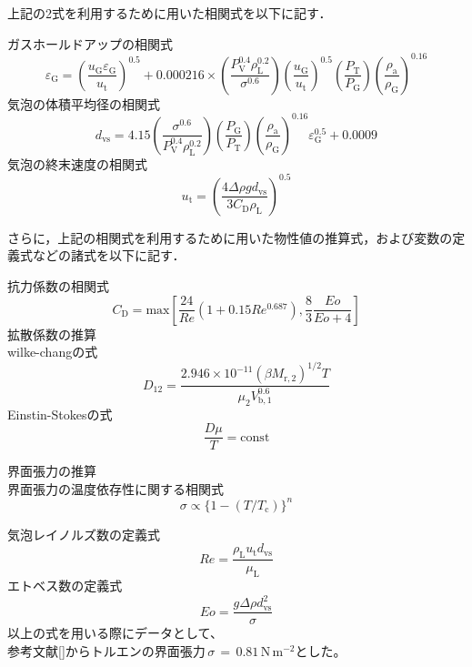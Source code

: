 \documentclass[a4j]{jsreport}
\begin{document}
上記の2式を利用するために用いた相関式を以下に記す．

ガスホールドアップの相関式
\begin{equation}
    \varepsilon_{\mathrm{ G}} = (\frac{u_{\mathrm{ G}}\varepsilon_{\mathrm{ G}}}{u_{\mathrm{ t}}}) ^{0.5} + 0.000216 \times(\frac{P_{\mathrm{ V}}^{0.4} \rho_{\mathrm{ L}}^{0.2} }{ \sigma^{0.6}})(\frac{u_{\mathrm{ G}}}{u_{\mathrm{ t}}})^{0.5}(\frac{P_{\mathrm{ T}}}{P_{\mathrm{ G}}})(\frac{\rho_{\mathrm{ a}}}{\rho_{\mathrm{ G}}})^{0.16}
\end{equation}
気泡の体積平均径の相関式
\begin{equation}
    d_{\mathrm{ vs}} = 4.15 (\frac{\sigma^{0.6}}{P_{\mathrm{ V}}^{0.4} \rho_{\mathrm{ L}}^{0.2}})(\frac{P_{\mathrm{ G}}}{P_{\mathrm{ T}}})(\frac{\rho_{\mathrm{ a}}}{\rho_{\mathrm{ G}}})^{0.16} \varepsilon_{\mathrm{ G}}^{0.5} + 0.0009
\end{equation}
気泡の終末速度の相関式
\begin{equation}
    u_{\mathrm{ t}} = (\frac{4\Delta \rho g d_{\mathrm{ vs}}}{3C_{\mathrm{ D}}\rho_{\mathrm{ L}}})^{0.5}
\end{equation}

さらに，上記の相関式を利用するために用いた物性値の推算式，および変数の定義式などの諸式を以下に記す．

抗力係数の相関式
\begin{equation}
    C_{\mathrm{ D}} = \mathrm{ max}[\frac{24}{Re}(1+0.15Re^{0.687}), \frac{8}{3}\frac{Eo}{Eo+4}]
\end{equation}
拡散係数の推算\\
wilke-changの式
\begin{equation}
    D_{12} = \frac{2.946\times 10^{-11}(\beta M_{\mathrm{ r,2}})^{1/2} T} {\mu_2 V_{\mathrm{ b,1}}^{0.6}}
\end{equation}
Einstin-Stokesの式
\begin{equation}
    \frac{D \mu}{T} = \mathrm{ const}
\end{equation}

界面張力の推算\\
界面張力の温度依存性に関する相関式
\begin{equation}
    \sigma \propto \{1-(T/T_{\mathrm{ c}}) \}^n
\end{equation}

気泡レイノルズ数の定義式
\begin{equation}
    Re = \frac{\rho_{\mathrm{ L}}u_{\mathrm{ t}}d_{\mathrm{ vs}}}{\mu_{\mathrm{ L}}}
\end{equation}
エトベス数の定義式
\begin{equation}
    Eo = \frac{g \Delta \rho d_{\mathrm{ vs}}^2}{\sigma}
\end{equation}
以上の式を用いる際にデータとして、\\
参考文献[]からトルエンの界面張力\,$\sigma\,=\,0.81\,\mathrm{ N\,m^{-2}}$とした。
\end{document}
